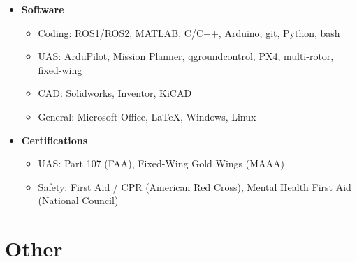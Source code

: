 \documentclass[12pt,letter,sans]{moderncv}        %
\begin{document}
\begin{itemize}
\vspace{4pt}

\item
{
    \textbf{Software}
        \vspace{3pt} 
        \begin{itemize}
            \item Coding: ROS1/ROS2, MATLAB, C/C++, Arduino, git, Python, bash
            \item UAS: ArduPilot, Mission Planner, qgroundcontrol, PX4, multi-rotor, fixed-wing
            \item CAD: Solidworks, Inventor, KiCAD
            \item General: Microsoft Office, \LaTeX, Windows, Linux
        \end{itemize}
}

\vspace{4pt}

\item
{
    \textbf{Certifications}
        \vspace{3pt} 
        \begin{itemize}
            \item UAS: Part 107 (FAA), Fixed-Wing Gold Wings (MAAA)
            \item Safety: First Aid / CPR (American Red Cross), Mental Health First Aid (National Council)
        \end{itemize}
}

\end{itemize}




\section{Other}
\end{document}
